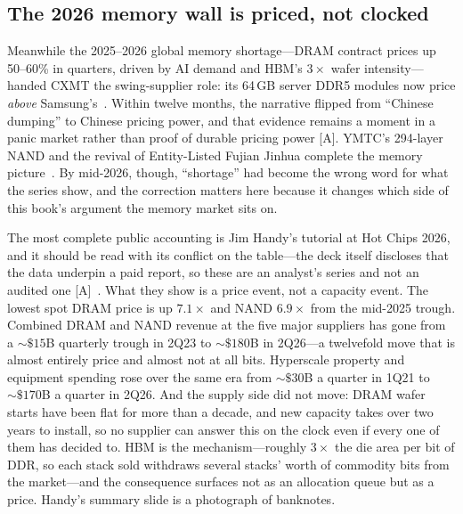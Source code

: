 \subsection{The 2026 memory wall is priced, not clocked}
\label{sec:memory-wall}

Meanwhile the 2025--2026 global memory shortage---DRAM contract prices up 50--60\% in quarters, driven by AI demand and HBM's $3\times$ wafer intensity---handed CXMT the swing-supplier role: its 64\,GB server DDR5 modules now price \emph{above} Samsung's~\cite{dram-shortage,cxmt-pricing}. Within twelve months, the narrative flipped from ``Chinese dumping'' to Chinese pricing power, and that evidence remains a moment in a panic market rather than proof of durable pricing power [A]. YMTC's 294-layer NAND and the revival of Entity-Listed Fujian Jinhua complete the memory picture~\cite{ymtc}. By mid-2026, though, ``shortage'' had become the wrong word for what the series show, and the correction matters here because it changes which side of this book's argument the memory market sits on.

The most complete public accounting is Jim Handy's tutorial at Hot Chips 2026, and it should be read with its conflict on the table---the deck itself discloses that the data underpin a paid report, so these are an analyst's series and not an audited one [A]~\cite{hc2026-memory-wall}. What they show is a price event, not a capacity event. The lowest spot DRAM price is up $7.1\times$ and NAND $6.9\times$ from the mid-2025 trough. Combined DRAM and NAND revenue at the five major suppliers has gone from a ${\sim}\$15$B quarterly trough in 2Q23 to ${\sim}\$180$B in 2Q26---a twelvefold move that is almost entirely price and almost not at all bits. Hyperscale property and equipment spending rose over the same era from ${\sim}\$30$B a quarter in 1Q21 to ${\sim}\$170$B a quarter in 2Q26. And the supply side did not move: DRAM wafer starts have been flat for more than a decade, and new capacity takes over two years to install, so no supplier can answer this on the clock even if every one of them has decided to. HBM is the mechanism---roughly $3\times$ the die area per bit of DDR, so each stack sold withdraws several stacks' worth of commodity bits from the market---and the consequence surfaces not as an allocation queue but as a price. Handy's summary slide is a photograph of banknotes.

